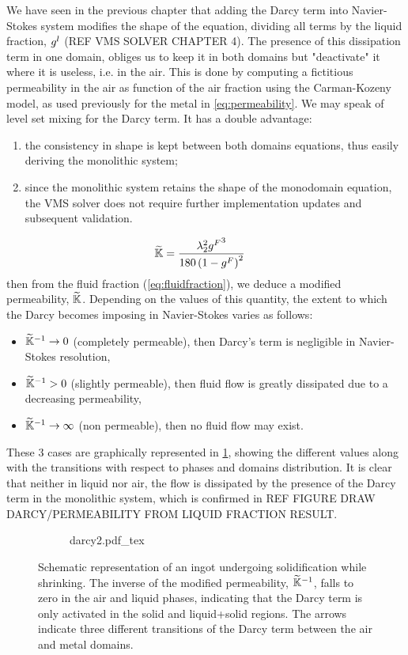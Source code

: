 We have seen in the previous chapter that adding the Darcy term into Navier-Stokes system modifies the shape of the 
equation, dividing all terms by the liquid fraction, ${g^l}$ (REF VMS SOLVER CHAPTER 4). The presence of this dissipation term 
in one domain, obliges us to keep it in both domains but "deactivate" it where it is useless, i.e. in the air.
This is done by computing a fictitious permeability in the air as function of the air fraction using the Carman-Kozeny model,
as used previously for the metal in \cref{eq:permeability}. We may speak of level set mixing for the Darcy term.
It has a double advantage:
\begin{enumerate}
\item the consistency in shape is kept between both domains equations, thus easily deriving the monolithic system;
\item since the monolithic system retains the shape of the monodomain equation, the VMS solver does not require further implementation updates
and subsequent validation.
\end{enumerate}
%
%
\begin{align}
\label{eq:darcy_modif}
&\widetilde{\mathbb{K}} = \frac{{\lambda}_{2}^2 {g^F}^3}{180\left( 1-{g^F} \right)^2}	
\end{align}
then from the fluid fraction (\cref{eq:fluidfraction}), we deduce a modified permeability, $\widetilde{\mathbb{K}}$. 
Depending on the values of this quantity, the extent to which the Darcy becomes imposing in Navier-Stokes varies as follows:
\begin{itemize}
\itemsep0em
\item $\widetilde{\mathbb{K}}^{-1} \rightarrow 0$ (completely permeable), then Darcy's term is negligible in Navier-Stokes resolution,
\item $\widetilde{\mathbb{K}}^{-1} > 0$ (slightly permeable), then fluid flow is greatly dissipated due to a decreasing permeability,
\item $\widetilde{\mathbb{K}}^{-1} \rightarrow \infty$ (non permeable), then no fluid flow may exist.
\end{itemize}
These 3 cases are graphically represented in \cref{fig:darcy_modif}, showing the different values along with the transitions 
with respect to phases and domains distribution. 
It is clear that neither in liquid nor air, the flow is dissipated by the presence of the Darcy
term in the monolithic system, which is confirmed in REF FIGURE DRAW DARCY/PERMEABILITY FROM LIQUID FRACTION RESULT.
\begin{figure}[htbp]
\centering
  \begin{subfigure}{1.0\textwidth}
    \centering
    \def\svgwidth{250pt}
	{darcy2.pdf_tex}
  \end{subfigure}
\caption{Schematic representation of an ingot undergoing solidification while shrinking. 
The inverse of the modified permeability, $\widetilde{\mathbb{K}}^{-1}$, falls to zero in the air and liquid phases,
indicating that the Darcy term is only activated in the solid and liquid+solid regions.
The arrows indicate three different transitions of the Darcy term between the air and metal domains.}
\label{fig:darcy_modif}
\end{figure}
